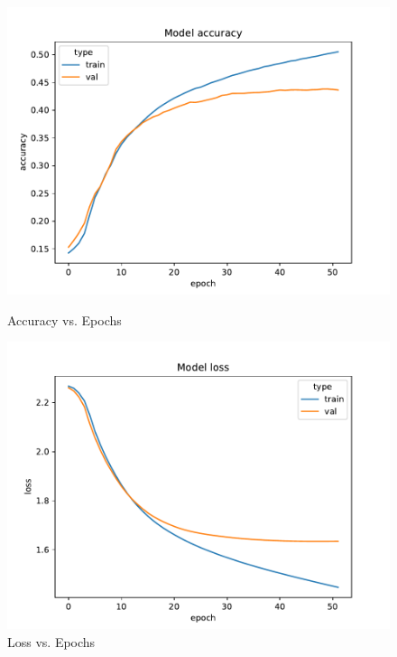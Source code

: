 \documentclass{article}
\begin{document}
    \begin{figure}[H]
        \begin{minipage}[b]{0.5\linewidth}
            \centering
            \includegraphics[width=\textwidth]{../plots/config_2c_accuracy}
            \caption{Accuracy vs. Epochs}
            \label{fig:figure1}
        \end{minipage}
        \hspace{0.2cm}
        \begin{minipage}[b]{0.5\linewidth}
            \centering
            \includegraphics[width=\textwidth]{../plots/config_2c_loss}
            \caption{Loss vs. Epochs}
            \label{fig:figure2}
        \end{minipage}
    \end{figure}
\end{document}
